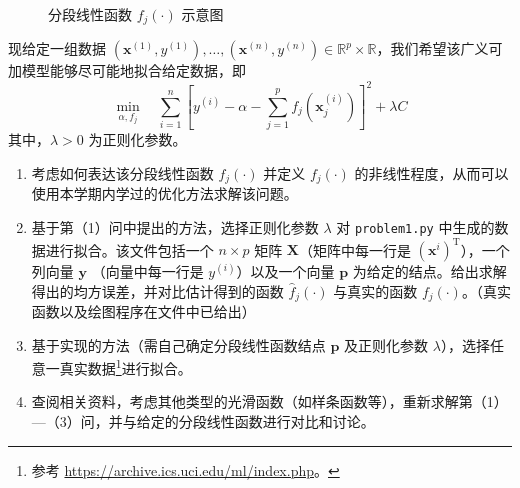 \documentclass[cn,12pt,mtpro2]{elegantpaper}
\begin{document}
\begin{figure}[htp]
    \centering
    \caption{分段线性函数 $f_{j}(\cdot)$ 示意图}
    \label{figure:piecewise-affine-function}
\end{figure}
现给定一组数据 $(\mathbf{x}^{(1)},y^{(1)}),\ldots,(\mathbf{x}^{(n)},y^{(n)})\in\mathbb{R}^{p}\times\mathbb{R}$，我们希望该广义可加模型能够尽可能地拟合给定数据，即
\begin{equation}
    \min_{\alpha,f_{j}}\quad\sum_{i=1}^{n}\left[y^{(i)}-\alpha-\sum_{j=1}^{p}f_{j}(\mathbf{x}^{(i)}_{j})\right]^{2}+\lambda C
\end{equation}
其中，$\lambda>0$ 为正则化参数。

\begin{enumerate}
    \item 考虑如何表达该分段线性函数 $f_{j}(\cdot)$ 并定义 $f_{j}(\cdot)$ 的非线性程度，从而可以使用本学期内学过的优化方法求解该问题。
    \item 基于第（1）问中提出的方法，选择正则化参数 $\lambda$ 对 \texttt{problem1.py} 中生成的数据进行拟合。该文件包括一个 $n\times p$ 矩阵 $\mathbf{X}$（矩阵中每一行是 $(\mathbf{x}^{i})^{\mathrm{T}}$），一个列向量 $\mathbf{y}$ （向量中每一行是 $y^{(i)}$）以及一个向量 $\mathbf{p}$ 为给定的结点。给出求解得出的均方误差，并对比估计得到的函数 $\hat{f}_{j}(\cdot)$ 与真实的函数 $f_{j}(\cdot)$。（真实函数以及绘图程序在文件中已给出）
    \item 基于实现的方法（需自己确定分段线性函数结点 $\mathbf{p}$ 及正则化参数 $\lambda$），选择任意一真实数据\footnote{参考 \url{https://archive.ics.uci.edu/ml/index.php}。}进行拟合。
    \item 查阅相关资料，考虑其他类型的光滑函数（如样条函数等），重新求解第（1）---（3）问，并与给定的分段线性函数进行对比和讨论。
\end{enumerate}
\end{document}

